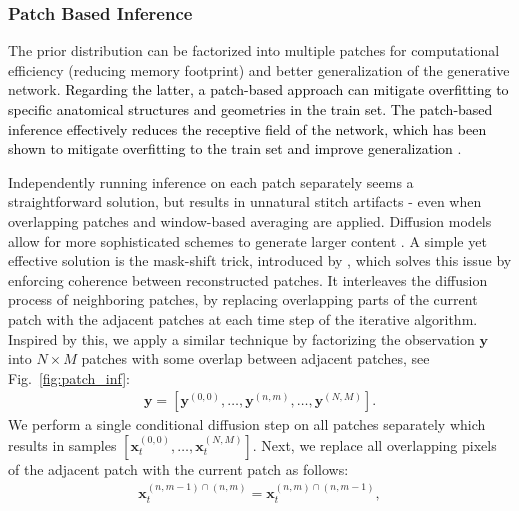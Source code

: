 \documentclass[journal,twoside,web]{ieeecolor}
\newcommand{\bx}{{\mathbf x}}
\newcommand{\by}{{\mathbf y}}
\newcommand{\TSW}[1]{{\textcolor{black}{#1}}}
\begin{document}
\subsubsection{Patch Based Inference}
\label{sec:patch_based}
The prior distribution can be factorized into multiple patches for computational efficiency (reducing memory footprint) and better generalization of the generative network. \TSW{Regarding the latter, a patch-based approach can mitigate overfitting to specific anatomical structures and geometries in the train set. The patch-based inference effectively reduces the receptive field of the network, which has been shown to mitigate overfitting to the train set and improve generalization \cite{koutiniReceptiveFieldRegularization2021}}.

Independently running inference on each patch separately seems a straightforward solution, but results in unnatural stitch artifacts - even when overlapping patches and window-based averaging are applied. Diffusion models allow for more sophisticated schemes to generate larger content \cite{zhangDiffCollageParallelGeneration2023}. A simple yet effective solution is the mask-shift trick, introduced by \cite{wangZeroShotImageRestoration2022}, which solves this issue by enforcing coherence between reconstructed patches. It interleaves the diffusion process of neighboring patches, by replacing overlapping parts of the current patch with the adjacent patches at each time step of the iterative algorithm. Inspired by this, we apply a similar technique by factorizing the observation $\by$ into $N\times M$ patches with some overlap between adjacent patches, see Fig.~\ref{fig:patch_inf}:
\begin{align}
    \by = [ \by^{(0, 0)}, \ldots, \by^{(n, m)}, \dots, \by^{(N, M)} ].
\end{align}
We perform a single conditional diffusion step on all patches separately which results in samples $[ \bx_{t}^{(0, 0)}, \ldots,\bx_t^{(N, M)} ]$. Next, we replace all overlapping pixels of the adjacent patch with the current patch as follows:
\begin{align}
    \bx_{t}^{(n, m-1)\cap(n, m)} =  \bx_{t}^{(n, m) \cap (n, m-1)},
    \label{eq:patch_replacement}
\end{align}
\end{document}
